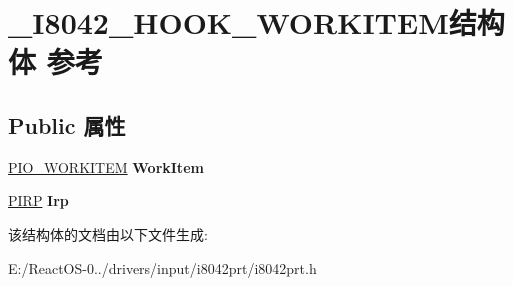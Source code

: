 \hypertarget{struct___i8042___h_o_o_k___w_o_r_k_i_t_e_m}{}\section{\+\_\+\+I8042\+\_\+\+H\+O\+O\+K\+\_\+\+W\+O\+R\+K\+I\+T\+E\+M结构体 参考}
\label{struct___i8042___h_o_o_k___w_o_r_k_i_t_e_m}
\subsection*{Public 属性}
\begin{DoxyCompactItemize}
\item 
\mbox{\label{struct___i8042___h_o_o_k___w_o_r_k_i_t_e_m_ae329e8a802caa67fbbe201b48c3c50aa}} 
\hyperlink{struct___i_o___w_o_r_k_i_t_e_m}{P\+I\+O\+\_\+\+W\+O\+R\+K\+I\+T\+EM} {\bfseries Work\+Item}
\item 
\mbox{\label{struct___i8042___h_o_o_k___w_o_r_k_i_t_e_m_a32136c9283747e17b99b58080b3dec31}} 
\hyperlink{interfacevoid}{P\+I\+RP} {\bfseries Irp}
\end{DoxyCompactItemize}


该结构体的文档由以下文件生成\+:\begin{DoxyCompactItemize}
\item 
E\+:/\+React\+O\+S-\/0../drivers/input/i8042prt/i8042prt.\+h\end{DoxyCompactItemize}
